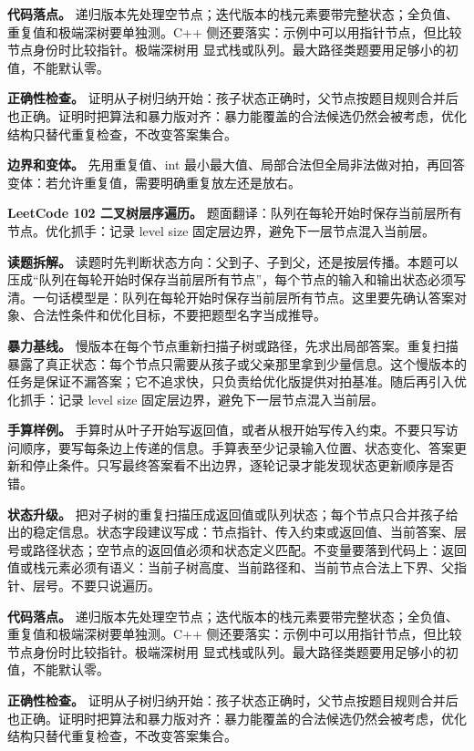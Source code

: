 \textbf{代码落点。} 递归版本先处理空节点；迭代版本的栈元素要带完整状态；全负值、重复值和极端深树要单独测。C++ 侧还要落实：示例中可以用指针节点，但比较节点身份时比较指针。极端深树用  显式栈或队列。最大路径类题要用足够小的初值，不能默认零。

\textbf{正确性检查。} 证明从子树归纳开始：孩子状态正确时，父节点按题目规则合并后也正确。证明时把算法和暴力版对齐：暴力能覆盖的合法候选仍然会被考虑，优化结构只替代重复检查，不改变答案集合。

\textbf{边界和变体。} 先用重复值、int 最小最大值、局部合法但全局非法做对拍，再回答变体：若允许重复值，需要明确重复放左还是放右。

\noindent\textbf{LeetCode 102 二叉树层序遍历。} 题面翻译：队列在每轮开始时保存当前层所有节点。优化抓手：记录 level size 固定层边界，避免下一层节点混入当前层。

\textbf{读题拆解。} 读题时先判断状态方向：父到子、子到父，还是按层传播。本题可以压成“队列在每轮开始时保存当前层所有节点”，每个节点的输入和输出状态必须写清。一句话模型是：队列在每轮开始时保存当前层所有节点。这里要先确认答案对象、合法性条件和优化目标，不要把题型名字当成推导。

\textbf{暴力基线。} 慢版本在每个节点重新扫描子树或路径，先求出局部答案。重复扫描暴露了真正状态：每个节点只需要从孩子或父亲那里拿到少量信息。这个慢版本的任务是保证不漏答案；它不追求快，只负责给优化版提供对拍基准。随后再引入优化抓手：记录 level size 固定层边界，避免下一层节点混入当前层。

\textbf{手算样例。} 手算时从叶子开始写返回值，或者从根开始写传入约束。不要只写访问顺序，要写每条边上传递的信息。手算表至少记录输入位置、状态变化、答案更新和停止条件。只写最终答案看不出边界，逐轮记录才能发现状态更新顺序是否错。

\textbf{状态升级。} 把对子树的重复扫描压成返回值或队列状态；每个节点只合并孩子给出的稳定信息。状态字段建议写成：节点指针、传入约束或返回值、当前答案、层号或路径状态；空节点的返回值必须和状态定义匹配。不变量要落到代码上：返回值或栈元素必须有语义：当前子树高度、当前路径和、当前节点合法上下界、父指针、层号。不要只说遍历。

\textbf{代码落点。} 递归版本先处理空节点；迭代版本的栈元素要带完整状态；全负值、重复值和极端深树要单独测。C++ 侧还要落实：示例中可以用指针节点，但比较节点身份时比较指针。极端深树用  显式栈或队列。最大路径类题要用足够小的初值，不能默认零。

\textbf{正确性检查。} 证明从子树归纳开始：孩子状态正确时，父节点按题目规则合并后也正确。证明时把算法和暴力版对齐：暴力能覆盖的合法候选仍然会被考虑，优化结构只替代重复检查，不改变答案集合。

